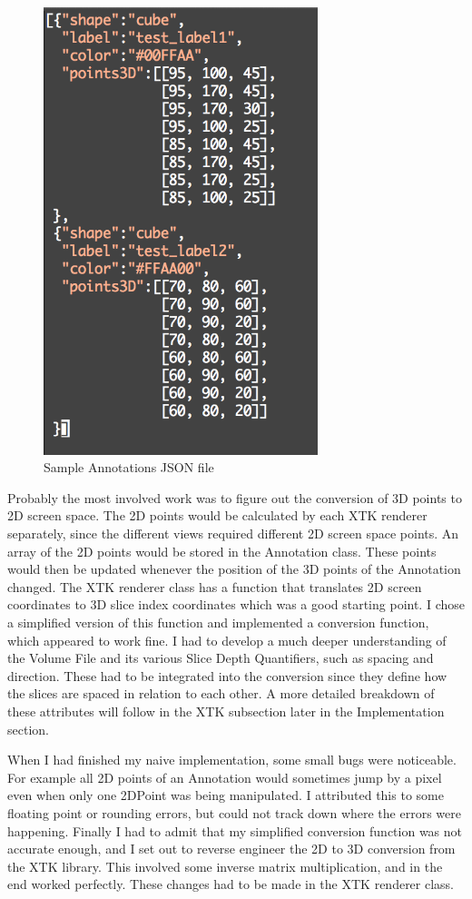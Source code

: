 \documentclass[a4paper,11pt,titlepage]{article}
\begin{document}
\begin{figure}[ht!]
\centering
\includegraphics[width=80mm]{graphics/AnnoJSON_01.png}
\caption{Sample Annotations JSON file}
\label{fig:UIdesign1}
\end{figure}



Probably the most involved work was to figure out the conversion of 3D points to 2D screen space. The 2D points would be calculated by each XTK renderer separately, since the different views required different 2D screen space points. An array of the 2D points would be stored in the Annotation class. These points would then be updated whenever the position of the 3D points of the Annotation changed. The XTK renderer class has a function that translates 2D screen coordinates to 3D slice index coordinates which was a good starting point. I chose a simplified version of this function and implemented a conversion function, which appeared to work fine. I had to develop a much deeper understanding of the Volume File and its various Slice Depth Quantifiers, such as spacing and direction. These had to be integrated into the conversion since they define how the slices are spaced in relation to each other. A more detailed breakdown of these attributes will follow in the XTK subsection later in the Implementation section.


When I had finished my naive implementation, some small bugs were noticeable. For example all 2D points of an Annotation would sometimes jump by a pixel even when only one 2DPoint was being manipulated. I attributed this to some floating point or rounding errors, but could not track down where the errors were happening. Finally I had to admit that my simplified conversion function was not accurate enough, and I set out to reverse engineer the 2D to 3D conversion from the XTK library. This involved some inverse matrix multiplication, and in the end worked perfectly. These changes had to be made in the XTK renderer class.
\end{document}
